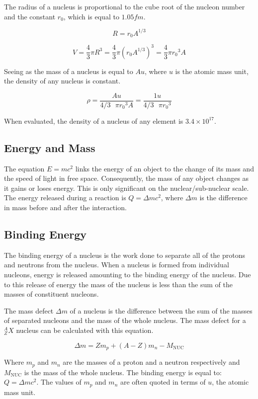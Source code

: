 \documentclass[12pt]{article}
\begin{document}
The radius of a nucleus is proportional to the cube root of the nucleon number and the constant \(r_0\), which is equal to \(1.05fm\).

\[R = r_0 A^{1/3}\]

\[V = \dfrac{4}{3} \pi R^3 = \dfrac{4}{3} \pi (r_0 A^{1/3})^3 = \dfrac{4}{3} \pi {r_0}^3 A\]

Seeing as the mass of a nucleus is equal to \(Au\), where \(u\) is the atomic mass unit, the density of any nucleus is constant.

\[\rho = \dfrac{Au}{4/3 \text{ } \pi {r_0}^3 A} = \dfrac{1u}{4/3 \text{ } \pi {r_0}^3}\]

When evaluated, the density of a nucleus of any element is \(3.4 \times 10^{17}\).

\subsection{Energy and Mass}
\label{sec:org294332f}

The equation \(E = mc^2\) links the energy of an object to the change of its mass and the speed of light in free space. Consequently, the mass of any object changes as it gains or loses energy. This is only significant on the nuclear/sub-nuclear scale. The energy released during a reaction is \(Q = \Delta mc^2\), where \(\Delta m\) is the difference in mass before and after the interaction.

\subsection{Binding Energy}
\label{sec:org344ec7d}

The binding energy of a nucleus is the work done to separate all of the protons and neutrons from the nucleus. When a nucleus is formed from individual nucleons, energy is released amounting to the binding energy of the nucleus. Due to this release of energy the mass of the nucleus is less than the sum of the masses of constituent nucleons.

The mass defect \(\Delta m\) of a nucleus is the difference between the sum of the masses of separated nucleons and the mass of the whole nucleus. The mass defect for a \(^A_ZX\) nucleus can be calculated with this equation.

\[\Delta m =  Zm_p + (A-Z)m_n - M_{\text{NUC}} \]

Where \(m_p\) and \(m_n\) are the masses of a proton and a neutron respectively and \(M_{\text{NUC}}\) is the mass of the whole nucleus. The binding energy is equal to: \(Q = \Delta mc^2\). The values of \(m_p\) and \(m_n\) are often quoted in terms of \(u\), the atomic mass unit.
\end{document}
